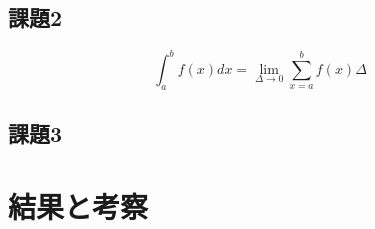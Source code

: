 \documentclass[dvipdfmx]{jsarticle}
\begin{document}
\subsection{課題2}

\begin{equation}
  \int_a^b f(x) dx = \lim_{\Delta \to 0} \sum_{x=a}^{b} f(x) \Delta
\end{equation}

\subsection{課題3}

\section{結果と考察}

\begin{thebibliography}{10}

  \url{}
\end{thebibliography}
\end{document}

